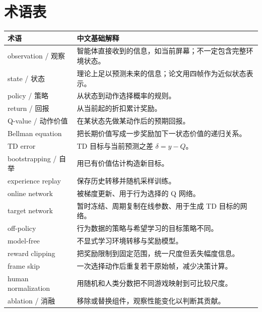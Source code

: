 \documentclass[UTF8,11pt]{ctexart}
\begin{document}
\section{术语表}
\begin{longtable}{p{}p{}}
\toprule
术语 & 中文基础解释\\
\midrule
observation / 观察 & 智能体直接收到的信息，如当前屏幕；不一定包含完整环境状态。\\
state / 状态 & 理论上足以预测未来的信息；论文用四帧作为近似状态表示。\\
policy / 策略 & 从状态到动作选择概率的规则。\\
return / 回报 & 从当前起的折扣累计奖励。\\
Q-value / 动作价值 & 在某状态先做某动作后的预期回报。\\
Bellman equation & 把长期价值写成一步奖励加下一状态价值的递归关系。\\
TD error & TD 目标与当前预测之差 $\delta=y-Q$。\\
bootstrapping / 自举 & 用已有价值估计构造新目标。\\
experience replay & 保存历史转移并随机采样训练。\\
online network & 被梯度更新、用于行为选择的 Q 网络。\\
target network & 暂时冻结、周期复制在线参数、用于生成 TD 目标的网络。\\
off-policy & 行为数据的策略与希望学习的目标策略不同。\\
model-free & 不显式学习环境转移与奖励模型。\\
reward clipping & 把奖励限制到固定范围，统一尺度但丢失幅度信息。\\
frame skip & 一次选择动作后重复若干原始帧，减少决策计算。\\
human normalization & 用随机和人类分数把不同游戏映射到可比较尺度。\\
ablation / 消融 & 移除或替换组件，观察性能变化以判断其贡献。\\
\bottomrule
\end{longtable}
\end{document}
